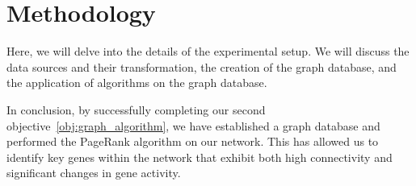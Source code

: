 \section{Methodology} \label{sec:methodology}

Here, we will delve into the details of the experimental setup.
We will discuss the data sources and their transformation, the creation of the graph database,
and the application of algorithms on the graph database.










In conclusion, by successfully completing our second objective~\cref{obj:graph_algorithm},
we have established a graph database and performed the PageRank algorithm on our network.
This has allowed us to identify key genes within the network that exhibit both high connectivity
and significant changes in gene activity.

